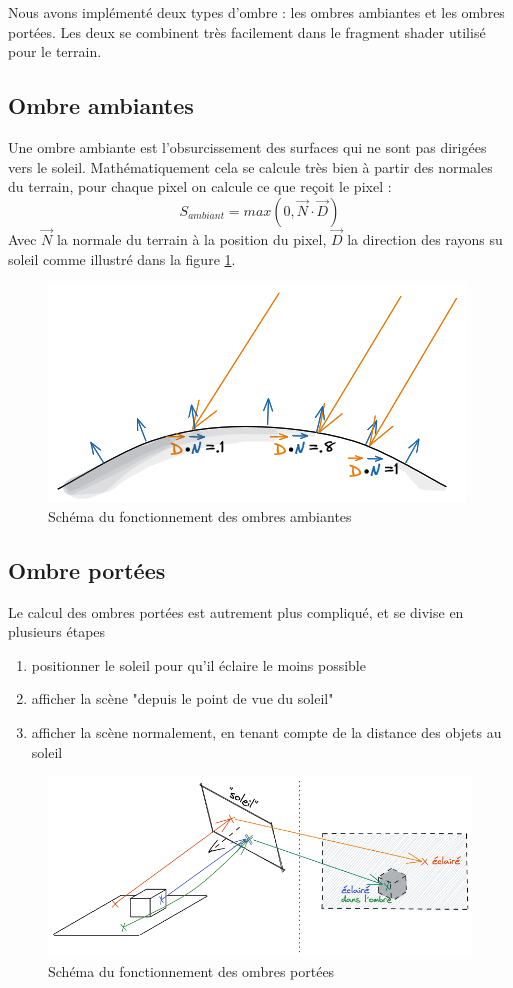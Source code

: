 \documentclass{EPUProjetDi}
\begin{document}
Nous avons implémenté deux types d'ombre : les ombres ambiantes et les ombres portées. Les deux se combinent très facilement dans le fragment shader utilisé pour le terrain.
\subsection{Ombre ambiantes}
Une ombre ambiante est l'obsurcissement des surfaces qui ne sont pas dirigées vers le soleil. Mathématiquement cela se calcule très bien à partir des normales du terrain, pour chaque pixel on calcule ce que reçoit le pixel :
$$ S_{ambiant}=max(0, \vec{N}\cdot \vec{D}) $$
Avec $\vec{N}$ la normale du terrain à la position du pixel, $\vec{D}$ la direction des rayons su soleil comme illustré dans la figure \ref{fig:ambiant_shadows_schema}.

\begin{figure}[ht]
	\centering
	\includegraphics[scale=.49]{ombres_ambiantes}
	\caption{Schéma du fonctionnement des ombres ambiantes}
	\label{fig:ambiant_shadows_schema}
\end{figure}

\subsection{Ombre portées}
\label{sec:casted_shadows}
Le calcul des ombres portées est autrement plus compliqué, et se divise en plusieurs étapes
\begin{enumerate}
\itemsep-.5em
\item positionner le soleil pour qu'il éclaire le moins possible
\item afficher la scène "depuis le point de vue du soleil"
\item afficher la scène normalement, en tenant compte de la distance des objets au soleil
\end{enumerate}

\begin{figure}[ht]
	\centering
	\includegraphics[scale=.49]{ombres}
	\caption{Schéma du fonctionnement des ombres portées}
	\label{fig:shadows_schema}
\end{figure}
\end{document}
